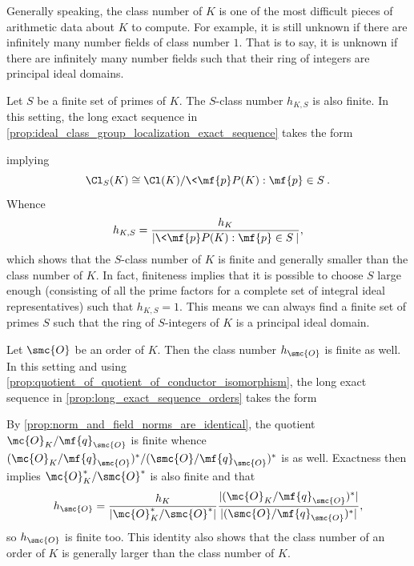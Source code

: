 \documentclass[12pt]{article}
\begin{document}
      Generally speaking, the class number of \(K\) is one of the most difficult pieces of arithmetic data about \(K\) to compute. For example, it is still unknown if there are infinitely many number fields of class number \(1\). That is to say, it is unknown if there are infinitely many number fields such that their ring of integers are principal ideal domains.

      Let \(S\) be a finite set of primes of \(K\). The \(S\)-class number \(h_{K,S}\) is also finite. In this setting, the long exact sequence in \cref{prop:ideal_class_group_localization_exact_sequence} takes the form
      \begin{center}
      \end{center}
      implying
      \[
        \Cl_{S}(K) \cong \Cl(K)/\<\mf{p}P(K):\mf{p} \in S\>.
      \]
      Whence
      \[
        h_{K,S} = \frac{h_{K}}{|\<\mf{p}P(K):\mf{p} \in S\>|},
      \]
      which shows that the \(S\)-class number of \(K\) is finite and generally smaller than the class number of \(K\). In fact, finiteness implies that it is possible to choose \(S\) large enough (consisting of all the prime factors for a complete set of integral ideal representatives) such that \(h_{K,S} = 1\). This means we can always find a finite set of primes \(S\) such that the ring of \(S\)-integers of \(K\) is a principal ideal domain.

      Let \(\smc{O}\) be an order of \(K\). Then the class number \(h_{\smc{O}}\) is finite as well. In this setting and using \cref{prop:quotient_of_quotient_of_conductor_isomorphism}, the long exact sequence in \cref{prop:long_exact_sequence_orders} takes the form
      \begin{center}
        \end{center}
      By \cref{prop:norm_and_field_norms_are_identical}, the quotient \(\mc{O}_{K}/\mf{q}_{\smc{O}}\) is finite whence \((\mc{O}_{K}/\mf{q}_{\smc{O}})^{\ast}/(\smc{O}/\mf{q}_{\smc{O}})^{\ast}\) is as well. Exactness then implies \(\mc{O}_{K}^{\ast}/\smc{O}^{\ast}\) is also finite and that
      \[
        h_{\smc{O}} = \frac{h_{K}}{|\mc{O}_{K}^{\ast}/\smc{O}^{\ast}|}\frac{|(\mc{O}_{K}/\mf{q}_{\smc{O}})^{\ast}|}{|(\smc{O}/\mf{q}_{\smc{O}})^{\ast}|},
      \]
      so \(h_{\smc{O}}\) is finite too. This identity also shows that the class number of an order of \(K\) is generally larger than the class number of \(K\).
\end{document}
